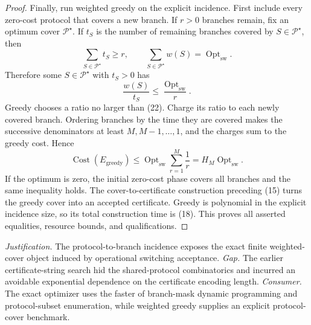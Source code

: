 \documentclass{article}
\begin{document}
\begin{proof}
Finally, run weighted greedy on the explicit incidence.  First include every zero-cost protocol that covers a new branch.  If \(r>0\) branches remain, fix an optimum cover \(\mathcal P^{\star}\).  If \(t_S\) is the number of remaining branches covered by \(S\in\mathcal P^{\star}\), then
\[
 \sum_{S\in\mathcal P^{\star}}t_S\geq r,
 \qquad
 \sum_{S\in\mathcal P^{\star}}w(S)=\operatorname{Opt}_{\mathrm{sw}}.
 \tag{21}
\]
Therefore some \(S\in\mathcal P^{\star}\) with \(t_S>0\) has
\[
 \frac{w(S)}{t_S}\leq\frac{\operatorname{Opt}_{\mathrm{sw}}}{r}.
 \tag{22}
\]
Greedy chooses a ratio no larger than (22).  Charge its ratio to each newly covered branch.  Ordering branches by the time they are covered makes the successive denominators at least \(M,M-1,\ldots,1\), and the charges sum to the greedy cost.  Hence
\[
 \operatorname{Cost}(E_{\mathrm{greedy}})
 \leq \operatorname{Opt}_{\mathrm{sw}}\sum_{r=1}^{M}\frac1r
 =H_M\operatorname{Opt}_{\mathrm{sw}}.
 \tag{23}
\]
If the optimum is zero, the initial zero-cost phase covers all branches and the same inequality holds.  The cover-to-certificate construction preceding (15) turns the greedy cover into an accepted certificate.  Greedy is polynomial in the explicit incidence size, so its total construction time is (18).  This proves all asserted equalities, resource bounds, and qualifications.
\end{proof}
\par\smallskip\noindent \textit{Justification.} The protocol-to-branch incidence exposes the exact finite weighted-cover object induced by operational switching acceptance. \textit{Gap.} The earlier certificate-string search hid the shared-protocol combinatorics and incurred an avoidable exponential dependence on the certificate encoding length. \textit{Consumer.} The exact optimizer uses the faster of branch-mask dynamic programming and protocol-subset enumeration, while weighted greedy supplies an explicit protocol-cover benchmark.
\end{document}
